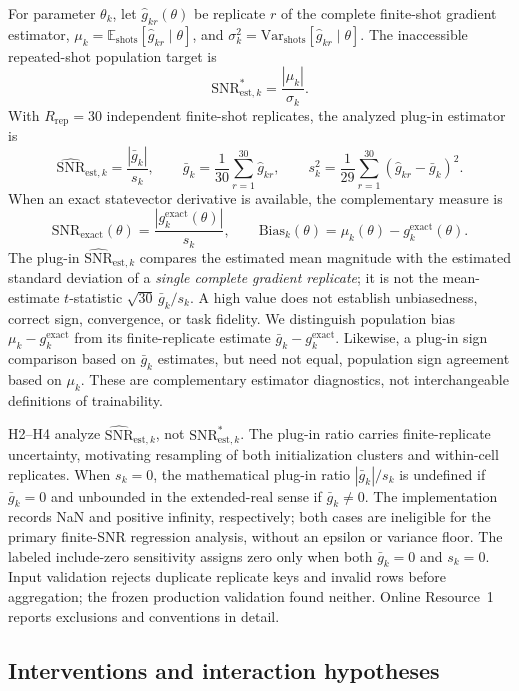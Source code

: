 \documentclass[pdflatex,sn-mathphys-num,Numbered]{sn-jnl}
\newcommand{\snrstark}{\mathrm{SNR}^{*}_{\mathrm{est},k}}
\newcommand{\snrestk}{\widehat{\mathrm{SNR}}_{\mathrm{est},k}}
\newcommand{\snrexact}{\mathrm{SNR}_{\mathrm{exact}}}
\begin{document}
For parameter $\theta_k$, let $\hat g_{kr}(\theta)$ be replicate $r$ of the complete finite-shot gradient estimator, $\mu_k=\mathbb{E}_{\mathrm{shots}}[\hat g_{kr}\mid\theta]$, and $\sigma_k^2=\mathrm{Var}_{\mathrm{shots}}[\hat g_{kr}\mid\theta]$. The inaccessible repeated-shot population target is
\[
\snrstark=\frac{|\mu_k|}{\sigma_k}.
\]
With $R_{\mathrm{rep}}=30$ independent finite-shot replicates, the analyzed plug-in estimator is
\[
\snrestk=\frac{|\bar g_k|}{s_k},\qquad
\bar g_k=\frac{1}{30}\sum_{r=1}^{30}\hat g_{kr},\qquad
s_k^2=\frac{1}{29}\sum_{r=1}^{30}(\hat g_{kr}-\bar g_k)^2.
\]
When an exact statevector derivative is available, the complementary measure is
\[
\snrexact(\theta)=
\frac{|g_k^{\mathrm{exact}}(\theta)|}{s_k},
\qquad
\mathrm{Bias}_k(\theta)=\mu_k(\theta)-g_k^{\mathrm{exact}}(\theta).
\]
The plug-in $\snrestk$ compares the estimated mean magnitude with the estimated standard deviation of a \emph{single complete gradient replicate}; it is not the mean-estimate $t$-statistic $\sqrt{30}\,\bar g_k/s_k$. A high value does not establish unbiasedness, correct sign, convergence, or task fidelity. We distinguish population bias $\mu_k-g_k^{\mathrm{exact}}$ from its finite-replicate estimate $\bar g_k-g_k^{\mathrm{exact}}$. Likewise, a plug-in sign comparison based on $\bar g_k$ estimates, but need not equal, population sign agreement based on $\mu_k$. These are complementary estimator diagnostics, not interchangeable definitions of trainability.

H2--H4 analyze $\snrestk$, not $\snrstark$. The plug-in ratio carries finite-replicate uncertainty, motivating resampling of both initialization clusters and within-cell replicates. When $s_k=0$, the mathematical plug-in ratio $|\bar g_k|/s_k$ is undefined if $\bar g_k=0$ and unbounded in the extended-real sense if $\bar g_k\ne0$. The implementation records NaN and positive infinity, respectively; both cases are ineligible for the primary finite-SNR regression analysis, without an epsilon or variance floor. The labeled include-zero sensitivity assigns zero only when both $\bar g_k=0$ and $s_k=0$. Input validation rejects duplicate replicate keys and invalid rows before aggregation; the frozen production validation found neither. Online Resource~1 reports exclusions and conventions in detail.

\subsection{Interventions and interaction hypotheses}
\end{document}
